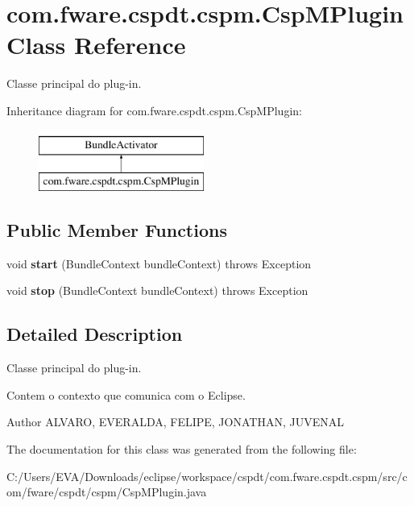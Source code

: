 \hypertarget{classcom_1_1fware_1_1cspdt_1_1cspm_1_1_csp_m_plugin}{}\section{com.\+fware.\+cspdt.\+cspm.\+Csp\+M\+Plugin Class Reference}
\label{classcom_1_1fware_1_1cspdt_1_1cspm_1_1_csp_m_plugin}


Classe principal do plug-\/in.  


Inheritance diagram for com.\+fware.\+cspdt.\+cspm.\+Csp\+M\+Plugin\+:\begin{figure}[H]
\begin{center}
\leavevmode
\includegraphics[height=2.000000cm]{classcom_1_1fware_1_1cspdt_1_1cspm_1_1_csp_m_plugin}
\end{center}
\end{figure}
\subsection*{Public Member Functions}
\begin{DoxyCompactItemize}
\item 
\mbox{\label{classcom_1_1fware_1_1cspdt_1_1cspm_1_1_csp_m_plugin_accefd95fec71382913ef73d5fe6b90ff}} 
void {\bfseries start} (Bundle\+Context bundle\+Context)  throws Exception 
\item 
\mbox{\label{classcom_1_1fware_1_1cspdt_1_1cspm_1_1_csp_m_plugin_a38b9433569a3c47b29d7ef1911017346}} 
void {\bfseries stop} (Bundle\+Context bundle\+Context)  throws Exception 
\end{DoxyCompactItemize}


\subsection{Detailed Description}
Classe principal do plug-\/in. 

Contem o contexto que comunica com o Eclipse.

\begin{DoxyAuthor}{Author}
A\+L\+V\+A\+RO, E\+V\+E\+R\+A\+L\+DA, F\+E\+L\+I\+PE, J\+O\+N\+A\+T\+H\+AN, J\+U\+V\+E\+N\+AL 
\end{DoxyAuthor}


The documentation for this class was generated from the following file\+:\begin{DoxyCompactItemize}
\item 
C\+:/\+Users/\+E\+V\+A/\+Downloads/eclipse/workspace/cspdt/com.\+fware.\+cspdt.\+cspm/src/com/fware/cspdt/cspm/Csp\+M\+Plugin.\+java\end{DoxyCompactItemize}
